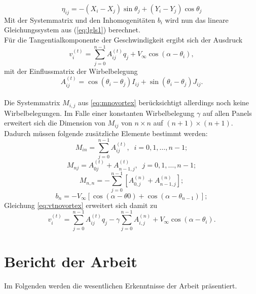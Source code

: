 \begin{equation}
\label{eq:eta}
\eta_{ij} =  -(X_i - X_j) \sin \theta _j + (Y_i - Y_j) \cos \theta _j
\end{equation}
Mit der Systemmatrix und den Inhomogenitäten $b_i$ wird nun das lineare Gleichungssystem aus (\ref{eq:lgls1}) berechnet. \\
Für die Tangentialkomponente der Geschwindigkeit ergibt sich der Ausdruck
\begin{equation}
\label{eq:vtnovortex}
v_i^{(t)} =  \sum_{j=0}^{n-1} A_{ij}^{(t)} q_j + V_{\infty} \cos{(\alpha - \theta_i)},
\end{equation}
mit der Einflussmatrix der Wirbelbelegung
\begin{equation}
\label{eq:At}
A_{ij}^{(t)} =  \cos{(\theta _i - \theta _j)} I_{ij} + \sin{(\theta _i - \theta _j)} J_{ij}.
\end{equation}
\\
Die Systemmatrix $M_{i,j}$ aus \eqref{eq:mnovortex} berücksichtigt allerdings noch keine Wirbelbelegungen. Im Falle einer konstanten Wirbelbelegung $\gamma$ auf allen Panels erweitert sich die Dimension von $M_{ij}$ von $n \times n$ auf $(n+1) \times (n+1)$. Dadurch müssen folgende zusätzliche Elemente bestimmt werden:
\begin{equation}
M_{in} =  \sum_{j=0}^{n-1} A_{ij}^{(t)}, \;\; i=0,1,\ldots, n-1;
\end{equation}
\begin{equation}
M_{nj} =  A_{0j}^{(t)} + A_{n-1,j}^{(t)}, \;\; j =0,1,\ldots, n-1;
\end{equation}
\begin{equation}
M_{n,n} =  - \sum_{j=0}^{n-1} \left[ A_{0,j}^{(n)} + A_{n-1,j}^{(n)}\right];
\end{equation}
\begin{equation}
b_n =  -V_{\infty} [\cos{(\alpha -\theta 0)} + \cos{(\alpha -\theta _{n-1})}];
\end{equation}
Gleichung \eqref{eq:vtnovortex} erweitert sich damit zu
\begin{equation}
v_i^{(t)} =  \sum_{j=0}^{n-1} A_{ij}^{(t)} q_j - \gamma \sum_{j=0}^{n-1}A_{i,j}^{(n)} + V_{\infty} \cos{(\alpha - \theta_i)}.
\end{equation}
\cite{Hess:1966} \cite{Cebeci:1999}
\newpage
\chapter{Bericht der Arbeit}
Im Folgenden werden die wesentlichen Erkenntnisse der Arbeit präsentiert.
